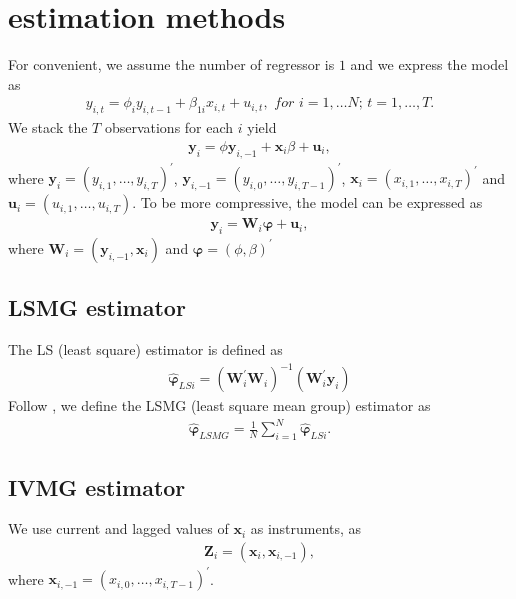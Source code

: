 \documentclass[12pt,a4paper,hyperref]{article}
\begin{document}
\section{estimation methods }
For convenient, we assume the number of regressor is $1$ and we express the model as
\begin{align}
y_{i,t}=\phi_{i} y_{i,t-1}+ \beta_{1i}x_{i,t}+u_{i,t}, \,\, for\,\,i=1,\ldots N;\,t=1,\ldots,T.
\end{align}
We stack the $T$ observations for each $i$ yield
\begin{align}
\boldsymbol{y}_{i}=\phi \boldsymbol{y}_{i,-1}+ \boldsymbol{x}_{i}\beta +\boldsymbol{u}_{i},
\end{align}
where $\boldsymbol{y}_{i}=\left(y_{i,1},  \ldots, y_{i,T} \right)^{'}$, $\boldsymbol{y}_{i,-1}=\left(y_{i,0},  \ldots, y_{i,T-1} \right)^{'}$, $\boldsymbol{x}_{i}=\left(x_{i,1},  \ldots, x_{i,T} \right)^{'}$ and $\boldsymbol{u}_{i}=\left(u_{i,1}, \ldots, u_{i,T} \right)$. To be more compressive, the model can be expressed as
\begin{align}
\boldsymbol{y}_{i}=\boldsymbol{W}_{i}\boldsymbol{\varphi}+\boldsymbol{u}_{i}, \label{7}
\end{align}
 where $\boldsymbol{W}_{i}=\left(\boldsymbol{y}_{i,-1}, \boldsymbol{x}_{i} \right)$ and $\boldsymbol{\varphi}=\left( \phi, \beta \right)^{'}$


\subsection{LSMG estimator}
The LS (least square) estimator is defined as
\begin{align}
\boldsymbol{\hat{\varphi}}_{LSi}=\left(\boldsymbol{W}^{'}_{i}\boldsymbol{W}_{i}  \right)^{-1}\left(\boldsymbol{W}^{'}_{i}\boldsymbol{y}_{i}  \right)
\end{align}
Follow \citet{Pesaran:1995}, we define the LSMG (least square mean group) estimator as
\begin{align}
\boldsymbol{\hat{\varphi}}_{LSMG}=\frac{1}{N}\sum^{N}_{i=1}\boldsymbol{\hat{\varphi}}_{LSi}.
\end{align}

\subsection{IVMG estimator}
We use current and lagged values of $\boldsymbol{x}_{i}$ as instruments, as
\begin{align}
\boldsymbol{Z}_{i}=\left( \boldsymbol{x}_{i}, \boldsymbol{x}_{i,-1} \right),
\end{align}
where $\boldsymbol{x}_{i,-1} =\left(x_{i,0},  \ldots, x_{i,T-1} \right)^{'}$.
\end{document}
